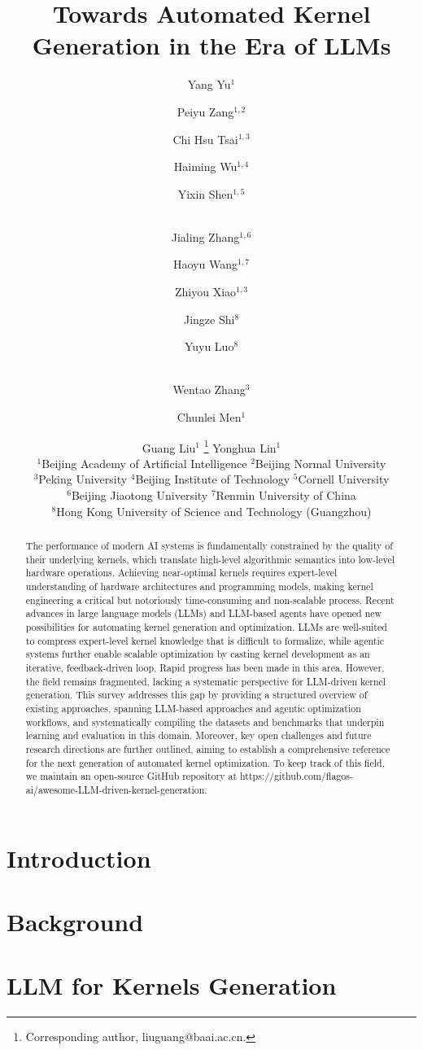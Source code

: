 \documentclass{article}
\title{Towards Automated Kernel Generation in the Era of LLMs}
\author{
Yang Yu$^1$
\and
Peiyu Zang$^{1,2}$
\and
Chi Hsu Tsai$^{1,3}$\and
Haiming Wu$^{1,4}$\and
Yixin Shen$^{1,5}$\and \\
Jialing Zhang$^{1,6}$\and
Haoyu Wang$^{1,7}$\and 
Zhiyou Xiao$^{1,3}$\and
Jingze Shi$^{8}$\and
Yuyu Luo$^{8}$\and \\
Wentao Zhang$^{3}$\and
Chunlei Men$^{1}$\and
Guang Liu$^{1}$ \footnote{Corresponding author, liuguang@baai.ac.cn.}\And
Yonghua Lin$^1$\\
\affiliations
$^1$Beijing Academy of Artificial Intelligence \quad
$^2$Beijing Normal University \\
$^3$Peking University \quad
$^4$Beijing Institute of Technology \quad
$^5$Cornell University \\
$^6$Beijing Jiaotong University \quad
$^7$Renmin University of China\\
$^8$Hong Kong University of Science and Technology (Guangzhou)\\
}
\begin{document}
\maketitle

\begin{abstract}
    The performance of modern AI systems is fundamentally constrained by the quality of their underlying kernels, which translate high-level algorithmic semantics into low-level hardware operations. Achieving near-optimal kernels requires expert-level understanding of hardware architectures and programming models, making kernel engineering a critical but notoriously time-consuming and non-scalable process. Recent advances in large language models (LLMs) and LLM-based agents have opened new possibilities for automating kernel generation and optimization. LLMs are well-suited to compress expert-level kernel knowledge that is difficult to formalize, while agentic systems further enable scalable optimization by casting kernel development as an iterative, feedback-driven loop. Rapid progress has been made in this area. However, the field remains fragmented, lacking a systematic perspective for LLM-driven kernel generation. This survey addresses this gap by providing a structured overview of existing approaches, spanning LLM-based approaches and agentic optimization workflows, and systematically compiling the datasets and benchmarks that underpin learning and evaluation in this domain. Moreover, key open challenges and future research directions are further outlined, aiming to establish a comprehensive reference for the next generation of automated kernel optimization. To keep track of this field, we maintain an open-source GitHub repository at https://github.com/flagos-ai/awesome-LLM-driven-kernel-generation.

\end{abstract}

\section{Introduction}
\label{sec:intro}


\section{Background}
\label{sec:background}


\section{LLM for Kernels Generation}
\label{sec:posttraining}

\end{document}
